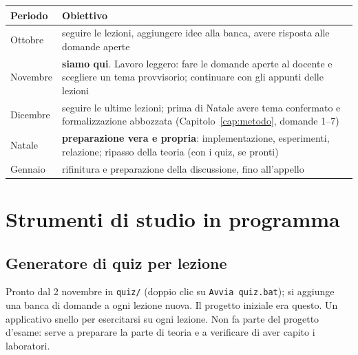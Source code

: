 \documentclass[11pt, a4paper, oneside, openany]{book}
\newcommand{\stato}[2]{\etichetta{#1}{#2}}
\begin{document}
\begin{center}
\renewcommand{\arraystretch}{1.25}
\begin{tabularx}{\linewidth}{@{}l X@{}}
\toprule
\textbf{Periodo} & \textbf{Obiettivo} \\
\midrule
Ottobre    & seguire le lezioni, aggiungere idee alla banca, avere risposta alle domande aperte \\
Novembre   & \textbf{siamo qui}. Lavoro leggero: fare le domande aperte al docente e scegliere
             un tema provvisorio; continuare con gli appunti delle lezioni \\
Dicembre   & seguire le ultime lezioni; prima di Natale avere tema confermato e
             formalizzazione abbozzata (Capitolo~\ref{cap:metodo}, domande 1--7) \\
Natale     & \textbf{preparazione vera e propria}: implementazione, esperimenti, relazione;
             ripasso della teoria (con i quiz, se pronti) \\
Gennaio    & rifinitura e preparazione della discussione, fino all'appello \\
\bottomrule
\end{tabularx}
\end{center}

\section{Strumenti di studio in programma}

\subsection*{Generatore di quiz per lezione \hfill\stato{verde}{FATTO}}

Pronto dal 2 novembre in \texttt{quiz/} (doppio clic su \texttt{Avvia quiz.bat}); si
aggiunge una banca di domande a ogni lezione nuova. Il progetto iniziale era questo.
Un applicativo snello per esercitarsi su ogni lezione. Non fa parte del progetto d'esame:
serve a preparare la parte di teoria e a verificare di aver capito i laboratori.
\end{document}
